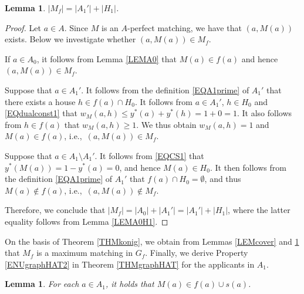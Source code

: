 \documentclass[11pt,a4paper,showkeys]{article}
\theoremstyle{plain}
\newtheorem{lemma}[theorem]{Lemma}
\theoremstyle{definition}
\begin{document}
\begin{lemma}
\label{LEMmf}
    $|M_f| = |A_1'| +|H_1|$. 
\end{lemma}

\begin{proof}
    Let $a\in A$. 
    Since $M$ is an $A$-perfect matching, 
    we have that $(a,M(a))$ exists. 
    Below we investigate whether $(a,M(a))\in M_f$. 

    If $a\in A_0$, it follows from Lemma \ref{LEMA0} that $M(a)\in f(a)$ and hence $(a,M(a))\in M_f$. 

    Suppose that $a\in A_1'$. 
    It follows from the definition \eqref{EQA1prime} of $A_1'$ that 
    there exists a house $h\in f(a) \cap H_0$. 
    It follows from $a\in A_1'$, $h\in H_0$ and \eqref{EQdualconst1} that $w_M(a,h) \le y^*(a)+y^*(h)=1+0=1$. 
    It also follows from $h\in f(a)$ that $w_M(a,h)\ge 1$. 
    We thus obtain $w_M(a,h)=1$ and $M(a)\in f(a)$, 
    i.e.,\ $(a,M(a))\in M_f$. 
    
    Suppose that $a\in A_1\setminus A_1'$. 
    It follows from \eqref{EQCS1} that $y^*(M(a))=1-y^*(a)=0$, 
    and hence $M(a)\in H_0$. 
    It then follows from the definition \eqref{EQA1prime} of $A_1'$ that 
    $f(a)\cap H_0=\emptyset$, 
    and thus $M(a)\not\in f(a)$, 
    i.e.,\ 
    $(a,M(a))\not \in M_f$. 

    Therefore, 
    we conclude that $|M_f|=|A_0|+|A_1'|=|A_1'| +|H_1|$, 
    where the latter equality follows from Lemma \ref{LEMA0H1}. 
\end{proof}

On the basis of Theorem \ref{THMkonig}, 
we obtain 
from Lemmas \ref{LEMcover} and \ref{LEMmf}
that $M_f$ is a maximum matching in $G_f$. 
Finally, 
we derive Property \ref{ENUgraphHAT2} in Theorem \ref{THMgraphHAT} 
for the applicants in $A_1$. 

\begin{lemma}
    \label{LEMA1}
    For each $a\in A_1$, 
    it holds that $M(a)\in f(a) \cup s(a)$. 
\end{lemma}
\end{document}
